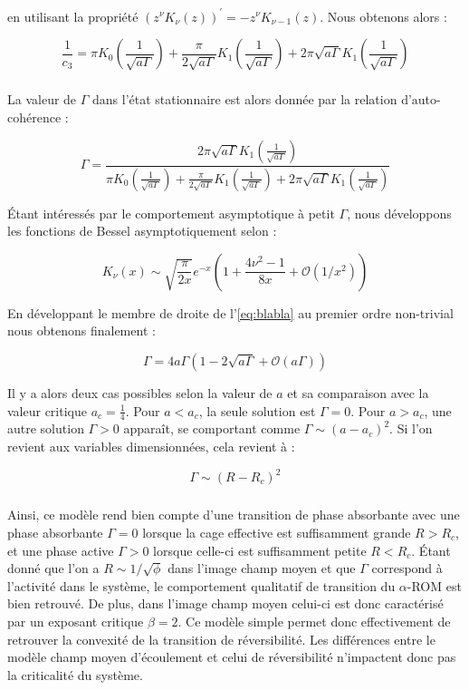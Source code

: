 \noindent en utilisant la propriété $(z^\nu K_\nu (z))^\prime = -z^\nu K_{\nu-1}(z)$. Nous obtenons alors :

\begin{equation}
\frac{1}{c_3} = \pi K_0\left( \frac{1}{\sqrt{a\Gamma}} \right) + \frac{\pi}{2\sqrt{a\Gamma}}K_1\left( \frac{1}{\sqrt{a\Gamma}} \right)+2\pi \sqrt{a\Gamma}K_1\left( \frac{1}{\sqrt{a\Gamma}} \right)
\end{equation}

\subparagraph{}La valeur de $\Gamma$ dans l'état stationnaire est alors donnée par la relation d'auto-cohérence :

\begin{equation}
	\Gamma = \frac{2\pi \sqrt{a\Gamma}K_1\left( \frac{1}{\sqrt{a\Gamma}} \right)}{\pi K_0\left( \frac{1}{\sqrt{a\Gamma}} \right) + \frac{\pi}{2\sqrt{a\Gamma}}K_1\left( \frac{1}{\sqrt{a\Gamma}} \right)+2\pi \sqrt{a\Gamma}K_1\left( \frac{1}{\sqrt{a\Gamma}} \right)}
	\label{eq:blabla}
\end{equation}

\noindent Étant intéressés par le comportement asymptotique à petit $\Gamma$, nous développons les fonctions de Bessel asymptotiquement selon :

\begin{equation}
	K_\nu (x) \sim \sqrt{\frac{\pi}{2x}}e^{-x}\left( 1+\frac{4\nu^2-1}{8x}+\mathcal{O}(1/x^2) \right)
\end{equation}

\noindent En développant le membre de droite de l'\autoref{eq:blabla} au premier ordre non-trivial nous obtenons finalement :

\begin{equation}
	\Gamma = 4a\Gamma\left( 1-2\sqrt{a\Gamma}+\mathcal{O}(a\Gamma) \right)
\end{equation}

\noindent Il y a alors deux cas possibles selon la valeur de $a$ et sa comparaison avec la valeur critique $a_c = \frac{1}{4}$. Pour $a<a_c$, la seule solution est $\Gamma = 0$. Pour $a>a_c$, une autre solution $\Gamma > 0$ apparaît, se comportant comme $\Gamma \sim (a-a_c)^2$. Si l'on revient aux variables dimensionnées, cela revient à :

\begin{equation}
	\Gamma \sim (R-R_c)^2
	\label{eq:resolhl2d}
\end{equation}

\subparagraph{}Ainsi, ce modèle rend bien compte d'une transition de phase absorbante avec une phase absorbante $\Gamma = 0$ lorsque la cage effective est suffisamment grande $R>R_c$, et une phase active $\Gamma >0$ lorsque celle-ci est suffisamment petite $R<R_c$. Étant donné que l'on a $R\sim 1/\sqrt{\phi}$ dans l'image champ moyen et que $\Gamma$ correspond à l'activité dans le système, le comportement qualitatif de transition du $\alpha$-ROM est bien retrouvé. De plus, dans l'image champ moyen celui-ci est donc caractérisé par un exposant critique $\beta = 2$. Ce modèle simple permet donc effectivement de retrouver la convexité de la transition de réversibilité. Les différences entre le modèle champ moyen d'écoulement et celui de réversibilité n'impactent donc pas la criticalité du système.

